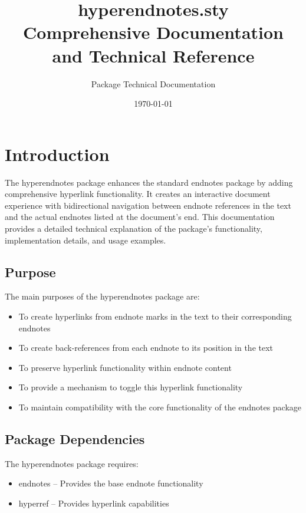 \documentclass[11pt]{article}
\title{\textbf{hyperendnotes.sty}\\[0.5em]\Large Comprehensive Documentation and Technical Reference}
\author{Package Technical Documentation}
\date{\today}
\newcommand{\pkg}[1]{\textsf{#1}}
\begin{document}
\maketitle

\tableofcontents

\newpage
\section{Introduction}

The \pkg{hyperendnotes} package enhances the standard \pkg{endnotes} package by adding comprehensive hyperlink functionality. It creates an interactive document experience with bidirectional navigation between endnote references in the text and the actual endnotes listed at the document's end. This documentation provides a detailed technical explanation of the package's functionality, implementation details, and usage examples.

\subsection{Purpose}

The main purposes of the \pkg{hyperendnotes} package are:

\begin{itemize}
  \item To create hyperlinks from endnote marks in the text to their corresponding endnotes
  \item To create back-references from each endnote to its position in the text
  \item To preserve hyperlink functionality within endnote content
  \item To provide a mechanism to toggle this hyperlink functionality
  \item To maintain compatibility with the core functionality of the \pkg{endnotes} package
\end{itemize}

\subsection{Package Dependencies}

The \pkg{hyperendnotes} package requires:

\begin{itemize}
  \item \pkg{endnotes} -- Provides the base endnote functionality
  \item \pkg{hyperref} -- Provides hyperlink capabilities
\end{itemize}
\end{document}
